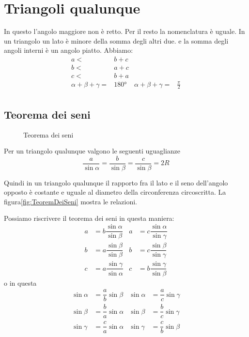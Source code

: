 \section{Triangoli qualunque}
In questo l'angolo maggiore non è  retto. Per il resto la nomenclatura è uguale. In un triangolo un lato è minore della somma degli altri due. e la somma degli angoli interni è un angolo piatto. Abbiamo:
 \begin{align*}
a<&b+c\\
b<&a+c\\
c<&b+a\\
\alpha+\beta+\gamma=&\ang{180}&\alpha+\beta+\gamma=&\frac{\pi}{2}\\
\end{align*}
\subsection{Teorema dei seni}
\begin{figure}
	\centering
	
	\caption{Teorema dei seni}
	\label{fig:TeoremDeiSeni}
\end{figure}
Per un triangolo qualunque valgono le seguenti uguaglianze\[\dfrac{a}{\sin\alpha}=\dfrac{b}{\sin\beta}=\dfrac{c}{\sin\beta}=2R \]

Quindi in un triangolo qualunque il rapporto fra il lato e il seno dell'angolo opposto è costante e uguale al diametro della circonferenza circoscritta. La figura\nobs\vref{fig:TeoremDeiSeni} mostra le relazioni.

Possiamo riscrivere il teorema dei seni in questa maniera: 
\begin{align*}
a&=b\dfrac{\sin\alpha}{\sin\beta}& a&=c\dfrac{\sin\alpha}{\sin\gamma}\\
b&=a\dfrac{\sin\beta}{\sin\beta}& b&=c\dfrac{\sin\beta}{\sin\gamma}\\
c&=a\dfrac{\sin\gamma}{\sin\alpha}& c&=b\dfrac{\sin\gamma}{\sin\beta}
\end{align*}
o in questa
\begin{align*}
\sin\alpha&=\dfrac{a}{b}\sin\beta&\sin\alpha&=\dfrac{a}{c}\sin\gamma\\
\sin\beta&=\dfrac{b}{a}\sin\alpha&\sin\beta&=\dfrac{b}{c}\sin\gamma\\
\sin\gamma&=\dfrac{c}{a}\sin\alpha&\sin\gamma&=\dfrac{c}{b}\sin\beta\\
\end{align*}
